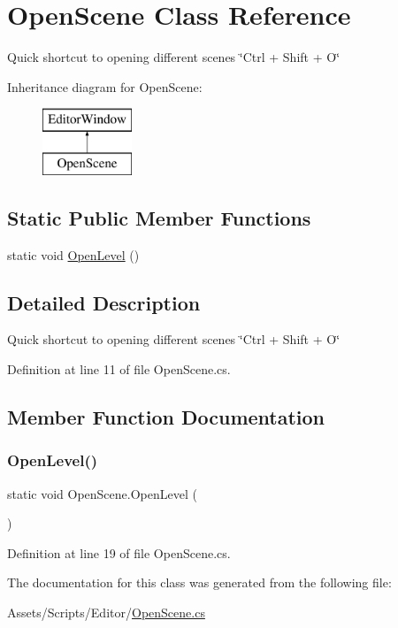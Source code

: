 \hypertarget{class_open_scene}{}\section{Open\+Scene Class Reference}
\label{class_open_scene}


Quick shortcut to opening different scenes \char`\"{}\+Ctrl + Shift + O\char`\"{}  


Inheritance diagram for Open\+Scene\+:\begin{figure}[H]
\begin{center}
\leavevmode
\includegraphics[height=2.000000cm]{class_open_scene}
\end{center}
\end{figure}
\subsection*{Static Public Member Functions}
\begin{DoxyCompactItemize}
\item 
static void \mbox{\hyperlink{class_open_scene_ad8fe8d8e5036801e6bf15df106b36e36}{Open\+Level}} ()
\end{DoxyCompactItemize}


\subsection{Detailed Description}
Quick shortcut to opening different scenes \char`\"{}\+Ctrl + Shift + O\char`\"{} 



Definition at line 11 of file Open\+Scene.\+cs.



\subsection{Member Function Documentation}
\mbox{\label{class_open_scene_ad8fe8d8e5036801e6bf15df106b36e36}} 
\subsubsection{\texorpdfstring{Open\+Level()}{OpenLevel()}}
{\footnotesize\ttfamily static void Open\+Scene.\+Open\+Level (\begin{DoxyParamCaption}{ }\end{DoxyParamCaption})\hspace{0.3cm}{\ttfamily [static]}}



Definition at line 19 of file Open\+Scene.\+cs.



The documentation for this class was generated from the following file\+:\begin{DoxyCompactItemize}
\item 
Assets/\+Scripts/\+Editor/\mbox{\hyperlink{_open_scene_8cs}{Open\+Scene.\+cs}}\end{DoxyCompactItemize}
